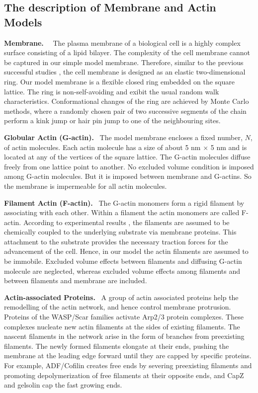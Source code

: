 \documentclass[aps,preprint,pre,array,epsfig,eqsecnum]{revtex4}
\begin{document}
\noindent
\subsection{The description of Membrane and Actin Models}

{\bf Membrane.}~~
The plasma membrane of a biological cell is a highly complex surface 
consisting of a lipid bilayer. The complexity of the cell membrane 
cannot be captured in our simple model membrane. Therefore, similar to the 
previous successful studies \cite{Leibler89,Sambeth01b,Satya04}, the 
cell membrane is designed as an elastic two-dimensional ring.
Our model membrane is a flexible 
closed ring embedded on the square lattice. The ring is 
non-self-avoiding
and exibit the usual random walk characteristics.
Conformational changes 
of the ring are achieved by Monte Carlo methods, where a randomly chosen pair 
of two successive segments of the chain perform a kink 
jump or hair pin jump to one of the neighbouring sites.


{\bf Globular Actin (G-actin).}~
The model membrane encloses a fixed number, $N$, of actin molecules. 
Each actin molecule has a size \cite{Alberts98}
of about 5 nm $\times$ 5 nm
and is located at any of the vertices of the square lattice. 
The G-actin molecules  diffuse freely from one lattice point to another. 
No excluded volume condition is imposed among G-actin molecules.
But it is imposed between membrane and G-actins. So the membrane is 
impermeable for all actin molecules.


{\bf Filament Actin (F-actin).}~
The G-actin monomers form a rigid filament by associating with each 
other. Within a filament the actin  monomers are called F-actin.
According to experimental results \cite{Horwitz02,DeMali03a},
the filaments are assumed to be chemically coupled to the
underlying substrate via membrane proteins. 
This attachment to the substrate provides the necessary traction forces
for the advancement of the cell.
Hence, in our model the actin filaments are assumed to be immobile.
%
Excluded volume effects between filaments and diffusing G-actin molecule 
are neglected, whereas excluded volume effects among filaments and between
filaments and membrane are included.


{\bf Actin-associated Proteins.}~
A group of actin associated proteins help the remodelling
of the actin network, and hence control membrane protrusion.
Proteins of the WASP/Scar families activate Arp2/3 protein complexes.
These complexes nucleate new actin filaments at the sides of existing filaments.
The nascent filaments in the network arise in the form of 
branches from preexisting filaments. 
The newly formed filaments elongate at their ends, pushing the 
membrane at the leading edge forward until they are capped by specific proteins.
For example,  
ADF/Cofilin creates free ends by severing preexisting filaments and 
promoting depolymerization of free filaments 
at their opposite ends, and 
CapZ and gelsolin cap the fast growing  ends.
\end{document}
